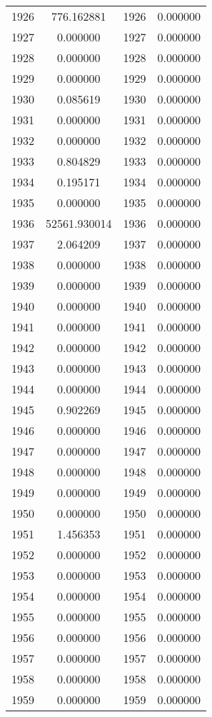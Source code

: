 \documentclass[12pt]{article}
\begin{document}
\begin{longtable}{@{}cccc@{}}
1926 & 776.162881 & 1926 & 0.000000 \\
1927 & 0.000000 & 1927 & 0.000000 \\
1928 & 0.000000 & 1928 & 0.000000 \\
1929 & 0.000000 & 1929 & 0.000000 \\
1930 & 0.085619 & 1930 & 0.000000 \\
1931 & 0.000000 & 1931 & 0.000000 \\
1932 & 0.000000 & 1932 & 0.000000 \\
1933 & 0.804829 & 1933 & 0.000000 \\
1934 & 0.195171 & 1934 & 0.000000 \\
1935 & 0.000000 & 1935 & 0.000000 \\
1936 & 52561.930014 & 1936 & 0.000000 \\
1937 & 2.064209 & 1937 & 0.000000 \\
1938 & 0.000000 & 1938 & 0.000000 \\
1939 & 0.000000 & 1939 & 0.000000 \\
1940 & 0.000000 & 1940 & 0.000000 \\
1941 & 0.000000 & 1941 & 0.000000 \\
1942 & 0.000000 & 1942 & 0.000000 \\
1943 & 0.000000 & 1943 & 0.000000 \\
1944 & 0.000000 & 1944 & 0.000000 \\
1945 & 0.902269 & 1945 & 0.000000 \\
1946 & 0.000000 & 1946 & 0.000000 \\
1947 & 0.000000 & 1947 & 0.000000 \\
1948 & 0.000000 & 1948 & 0.000000 \\
1949 & 0.000000 & 1949 & 0.000000 \\
1950 & 0.000000 & 1950 & 0.000000 \\
1951 & 1.456353 & 1951 & 0.000000 \\
1952 & 0.000000 & 1952 & 0.000000 \\
1953 & 0.000000 & 1953 & 0.000000 \\
1954 & 0.000000 & 1954 & 0.000000 \\
1955 & 0.000000 & 1955 & 0.000000 \\
1956 & 0.000000 & 1956 & 0.000000 \\
1957 & 0.000000 & 1957 & 0.000000 \\
1958 & 0.000000 & 1958 & 0.000000 \\
1959 & 0.000000 & 1959 & 0.000000 \\

\end{longtable}
\end{document}
